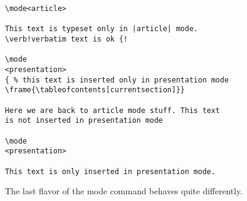 \begin{command}{\mode{}}
  \example
\begin{verbatim}
\mode<article>

This text is typeset only in |article| mode.
\verb!verbatim text is ok {!

\mode
<presentation>
{ % this text is inserted only in presentation mode
\frame{\tableofcontents[currentsection]}}

Here we are back to article mode stuff. This text
is not inserted in presentation mode

\mode
<presentation>

This text is only inserted in presentation mode.
\end{verbatim}
\end{command}

The last flavor of the mode command behaves quite differently.

